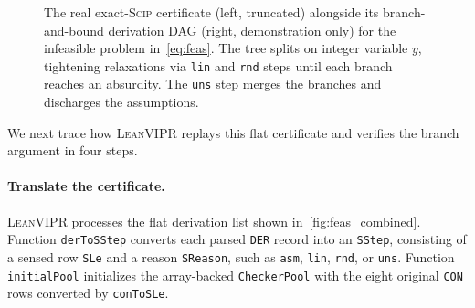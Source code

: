 \documentclass{article}
\newcommand{\code}[1]{\textcolor{blue!70!black}{\texttt{#1}}}
\newcommand{\tool}{\textsc{LeanVIPR}}
\newcommand{\scip}{\textsc{Scip}}
\begin{document}
\begin{figure}[t]
\begin{minipage}[t]{0.48\textwidth}
{
}
\end{minipage}
\caption{The real exact-\scip{} certificate (left, truncated) alongside its branch-and-bound derivation DAG (right, demonstration only) for the infeasible problem in~\autoref{eq:feas}.
The tree splits on integer variable $y$, tightening relaxations via \code{lin} and \code{rnd} steps until each branch reaches an absurdity.
The \code{uns} step merges the branches and discharges the assumptions.}
\label{fig:feas_combined}
\end{figure}

We next trace how \tool{} replays this flat certificate and verifies the branch argument in four steps.

\paragraph{Translate the certificate.}
\tool{} processes the flat derivation list shown in~\autoref{fig:feas_combined}.
Function \code{derToSStep} converts each parsed \code{DER} record into an \code{SStep}, consisting of a sensed row \code{SLe} and a reason \code{SReason}, such as \code{asm}, \code{lin}, \code{rnd}, or \code{uns}.
Function \code{initialPool} initializes the array-backed \code{CheckerPool} with the eight original \code{CON} rows converted by \code{conToSLe}.
\end{document}
